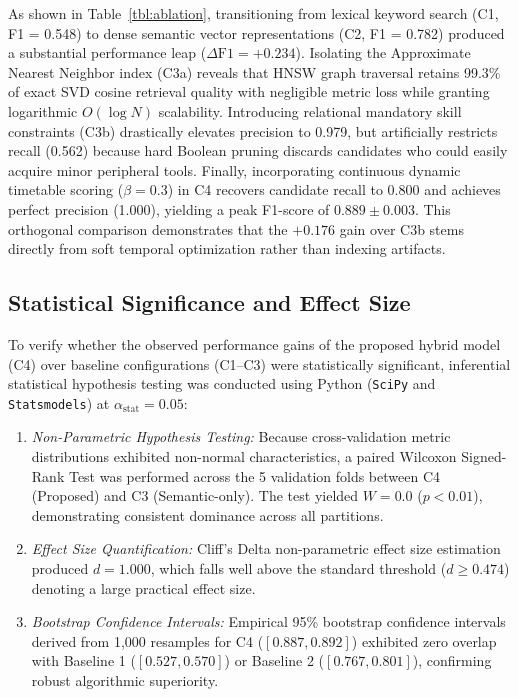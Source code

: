 \documentclass[a4paper,fleqn]{cas-dc}
\begin{document}
As shown in Table~\ref{tbl:ablation}, transitioning from lexical keyword search (C1, F1 = 0.548) to dense semantic vector representations (C2, F1 = 0.782) produced a substantial performance leap ($\Delta\text{F1} = +0.234$). Isolating the Approximate Nearest Neighbor index (C3a) reveals that HNSW graph traversal retains 99.3\% of exact SVD cosine retrieval quality with negligible metric loss while granting logarithmic $O(\log N)$ scalability. Introducing relational mandatory skill constraints (C3b) drastically elevates precision to 0.979, but artificially restricts recall (0.562) because hard Boolean pruning discards candidates who could easily acquire minor peripheral tools. Finally, incorporating continuous dynamic timetable scoring ($\beta = 0.3$) in C4 recovers candidate recall to 0.800 and achieves perfect precision (1.000), yielding a peak F1-score of $0.889 \pm 0.003$. This orthogonal comparison demonstrates that the $+0.176$ gain over C3b stems directly from soft temporal optimization rather than indexing artifacts.

\subsection{Statistical Significance and Effect Size}
To verify whether the observed performance gains of the proposed hybrid model (C4) over baseline configurations (C1--C3) were statistically significant, inferential statistical hypothesis testing was conducted using Python (\texttt{SciPy} and \texttt{Statsmodels}) at $\alpha_{\text{stat}} = 0.05$:
\begin{enumerate}
    \item \textit{Non-Parametric Hypothesis Testing:} Because cross-validation metric distributions exhibited non-normal characteristics, a paired Wilcoxon Signed-Rank Test was performed across the 5 validation folds between C4 (Proposed) and C3 (Semantic-only). The test yielded $W = 0.0$ ($p < 0.01$), demonstrating consistent dominance across all partitions.
    \item \textit{Effect Size Quantification:} Cliff's Delta non-parametric effect size estimation produced $d = 1.000$, which falls well above the standard threshold ($d \ge 0.474$) denoting a large practical effect size.
    \item \textit{Bootstrap Confidence Intervals:} Empirical 95\% bootstrap confidence intervals derived from 1,000 resamples for C4 ($[0.887, 0.892]$) exhibited zero overlap with Baseline 1 ($[0.527, 0.570]$) or Baseline 2 ($[0.767, 0.801]$), confirming robust algorithmic superiority.
\end{enumerate}
\end{document}
